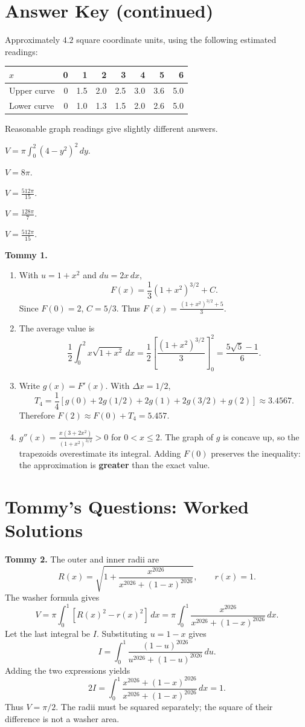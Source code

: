 \documentclass[11pt]{article}
\newcommand{\ansitem}[1]{\item[\textbf{#1.}]}
\begin{document}
\section*{Answer Key (continued)}
\begin{description}[leftmargin=2.7em,labelwidth=2em,itemsep=15pt]
\ansitem{16} Approximately $4.2$ square coordinate units, using the following estimated readings:
\begin{center}\small
\begin{tabular}{lrrrrrrr}\toprule
$x$ & 0 & 1 & 2 & 3 & 4 & 5 & 6\\\midrule
Upper curve & 0 & 1.5 & 2.0 & 2.5 & 3.0 & 3.6 & 5.0\\
Lower curve & 0 & 1.0 & 1.3 & 1.5 & 2.0 & 2.6 & 5.0\\\bottomrule
\end{tabular}\end{center}
Reasonable graph readings give slightly different answers.
\ansitem{17} $\displaystyle V=\pi\int_0^2(4-y^2)^2\,dy$.
\ansitem{18} $\displaystyle V=8\pi$.
\ansitem{19} $\displaystyle V=\frac{512\pi}{15}$.
\ansitem{20} $\displaystyle V=\frac{128\pi}{7}$.
\ansitem{21} $\displaystyle V=\frac{512\pi}{15}$.
\end{description}
\bigskip
\textbf{Tommy 1.}
\begin{enumerate}[label=\textbf{(\alph*)},leftmargin=2em,itemsep=9pt]
\item With $u=1+x^2$ and $du=2x\,dx$,
\[F(x)=\frac13(1+x^2)^{3/2}+C.\]
Since $F(0)=2$, $C=5/3$. Thus $\boxed{F(x)=\frac{(1+x^2)^{3/2}+5}{3}}$.
\item The average value is
\[\frac12\int_0^2 x\sqrt{1+x^2}\,dx
=\frac12\left[\frac{(1+x^2)^{3/2}}3\right]_0^2
=\boxed{\frac{5\sqrt5-1}{6}}.\]
\item Write $g(x)=F'(x)$. With $\Delta x=1/2$,
\[T_4=\frac14\left[g(0)+2g(1/2)+2g(1)+2g(3/2)+g(2)\right]
\approx3.4567.\]
Therefore $F(2)\approx F(0)+T_4=\boxed{5.457}$.
\item $\displaystyle g''(x)=\frac{x(3+2x^2)}{(1+x^2)^{3/2}}>0$ for $0<x\leq2$.
The graph of $g$ is concave up, so the trapezoids overestimate its integral.
Adding $F(0)$ preserves the inequality: the approximation is \textbf{greater} than the exact value.
\end{enumerate}
\clearpage

\section*{Tommy's Questions: Worked Solutions}
\textbf{Tommy 2.} The outer and inner radii are
\[R(x)=\sqrt{1+\frac{x^{2026}}{x^{2026}+(1-x)^{2026}}},\qquad r(x)=1.\]
The washer formula gives
\[V=\pi\int_0^1\left[R(x)^2-r(x)^2\right]\,dx
=\pi\int_0^1\frac{x^{2026}}{x^{2026}+(1-x)^{2026}}\,dx.\]
Let the last integral be $I$. Substituting $u=1-x$ gives
\[I=\int_0^1\frac{(1-u)^{2026}}{u^{2026}+(1-u)^{2026}}\,du.\]
Adding the two expressions yields
\[2I=\int_0^1\frac{x^{2026}+(1-x)^{2026}}{x^{2026}+(1-x)^{2026}}\,dx=1.\]
Thus $\boxed{V=\pi/2}$. The radii must be squared separately; the square of their difference is not a washer area.
\bigskip
\end{document}
